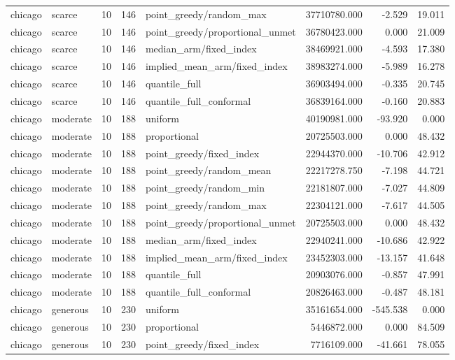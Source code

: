 \begin{tabular}{llrrlrrr}
chicago & scarce & 10 & 146 & point\_greedy/random\_max & 37710780.000 & -2.529 & 19.011 \\
chicago & scarce & 10 & 146 & point\_greedy/proportional\_unmet & 36780423.000 & 0.000 & 21.009 \\
chicago & scarce & 10 & 146 & median\_arm/fixed\_index & 38469921.000 & -4.593 & 17.380 \\
chicago & scarce & 10 & 146 & implied\_mean\_arm/fixed\_index & 38983274.000 & -5.989 & 16.278 \\
chicago & scarce & 10 & 146 & quantile\_full & 36903494.000 & -0.335 & 20.745 \\
chicago & scarce & 10 & 146 & quantile\_full\_conformal & 36839164.000 & -0.160 & 20.883 \\
chicago & moderate & 10 & 188 & uniform & 40190981.000 & -93.920 & 0.000 \\
chicago & moderate & 10 & 188 & proportional & 20725503.000 & 0.000 & 48.432 \\
chicago & moderate & 10 & 188 & point\_greedy/fixed\_index & 22944370.000 & -10.706 & 42.912 \\
chicago & moderate & 10 & 188 & point\_greedy/random\_mean & 22217278.750 & -7.198 & 44.721 \\
chicago & moderate & 10 & 188 & point\_greedy/random\_min & 22181807.000 & -7.027 & 44.809 \\
chicago & moderate & 10 & 188 & point\_greedy/random\_max & 22304121.000 & -7.617 & 44.505 \\
chicago & moderate & 10 & 188 & point\_greedy/proportional\_unmet & 20725503.000 & 0.000 & 48.432 \\
chicago & moderate & 10 & 188 & median\_arm/fixed\_index & 22940241.000 & -10.686 & 42.922 \\
chicago & moderate & 10 & 188 & implied\_mean\_arm/fixed\_index & 23452303.000 & -13.157 & 41.648 \\
chicago & moderate & 10 & 188 & quantile\_full & 20903076.000 & -0.857 & 47.991 \\
chicago & moderate & 10 & 188 & quantile\_full\_conformal & 20826463.000 & -0.487 & 48.181 \\
chicago & generous & 10 & 230 & uniform & 35161654.000 & -545.538 & 0.000 \\
chicago & generous & 10 & 230 & proportional & 5446872.000 & 0.000 & 84.509 \\
chicago & generous & 10 & 230 & point\_greedy/fixed\_index & 7716109.000 & -41.661 & 78.055 \\

\end{tabular}
